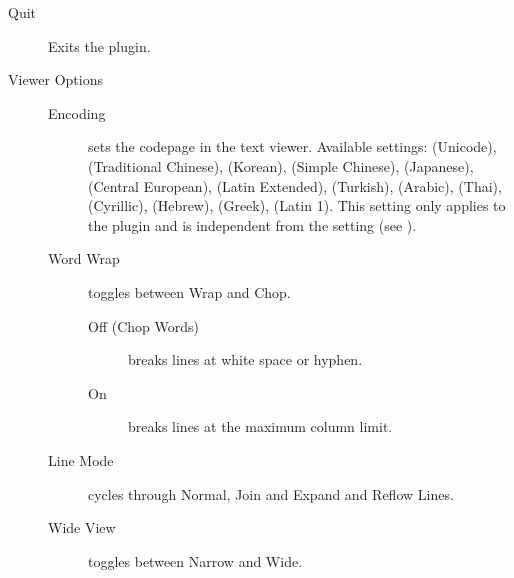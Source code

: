 \begin{description}
\item[Quit] Exits the plugin.
\item[Viewer Options]
    \begin{description}
    \item[Encoding]
    sets the codepage in the text viewer.
    Available settings:
     (Unicode),
     (Traditional Chinese),
     (Korean),
     (Simple Chinese),
     (Japanese),
     (Central European),
     (Latin Extended),
     (Turkish),
     (Arabic),
     (Thai),
     (Cyrillic),
     (Hebrew),
     (Greek),
     (Latin 1).
    This setting only applies to the plugin and is independent from the
     setting (see ).
    \item[Word Wrap] toggles between Wrap and Chop.
        \begin{description}
            \item[Off (Chop Words)] breaks lines at white space or hyphen.
            \item[On] breaks lines at the maximum column limit.
        \end{description}
    \item[Line Mode] cycles through Normal, Join and Expand and Reflow Lines.
    \item[Wide View] toggles between Narrow and Wide.
        \begin{description}

\end{description}
\end{description}
\end{description}
